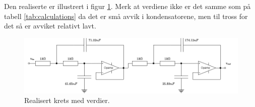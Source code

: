 Den realiserte er illustrert i figur \ref{fig:01realised}. Merk at verdiene ikke er det samme som på tabell \ref{tab:calculations} da det er små avvik i kondensatorene, men til tross for det så er avviket relativt lavt.

\begin{figure}[!hbt]
	\centering
	\includegraphics[scale=0.45]{./Images/03Research/01realisertkrets.png}
	\caption{Realisert krets med verdier.}
	\label{fig:01realised}
\end{figure}